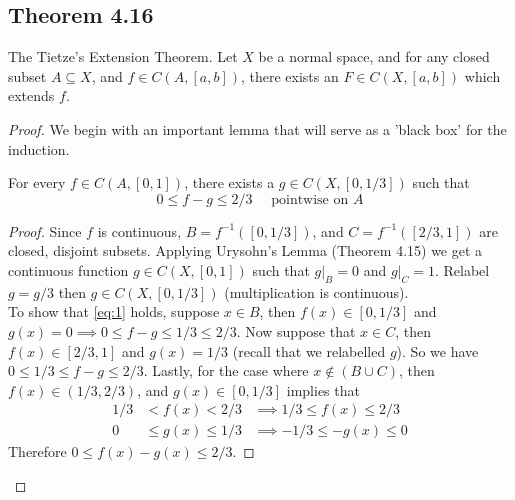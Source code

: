 \documentclass[../../main.tex]{subfiles}
\begin{document}
\subsection{Theorem 4.16}
\begin{wts}
The Tietze's Extension Theorem. Let $X$ be a normal space, and for any closed subset $A\subseteq X$, and $f\in C(A,[a,b])$, there exists an $F\in C(X,[a,b])$ which extends $f$.
\end{wts}
\begin{proof}
We begin with an important lemma that will serve as a 'black box' for the induction.
\begin{lemma}\label{lemma:1}
For every $f\in C(A,[0,1])$, there exists a $g\in C(X, [0, 1/3])$ such that 
\begin{equation}\label{eq:1}
0\leq f-g\leq 2/3 \quad\textrm{ pointwise on } A    
\end{equation}
\end{lemma}
\begin{proof}
Since $f$ is continuous, $B=f^{-1}([0,1/3])$, and $C=f^{-1}([2/3,1])$ are closed, disjoint subsets. Applying Urysohn's Lemma (Theorem 4.15) we get a continuous function $g\in C(X,[0,1])$ such that $g|_B = 0$ and $g|_C = 1$. Relabel $g=g/3$ then $g\in C(X,[0,1/3])$ (multiplication is continuous).\\

To show that \eqref{eq:1} holds, suppose $x\in B$, then $f(x)\in[0,1/3]$ and $g(x)=0\implies 0\leq f-g\leq 1/3\leq 2/3$. Now suppose that $x\in C$, then $f(x)\in[2/3,1]$ and $g(x)=1/3$ (recall that we relabelled $g$). So we have $0\leq 1/3\leq f-g\leq 2/3$. Lastly, for the case where $x\notin (B\cup C)$, then $f(x)\in (1/3, 2/3)$, and $g(x)\in[0, 1/3]$ implies that 
\begin{align*}
    1/3 &<    f(x) <    2/3 &\implies 1/3 \leq   f(x) \leq 2/3\\
    0   &\leq g(x) \leq 1/3 &\implies -1/3 \leq -g(x) \leq 0    
\end{align*}
Therefore $0\leq f(x)-g(x)\leq 2/3$.
\end{proof}


\end{proof}
\end{document}
